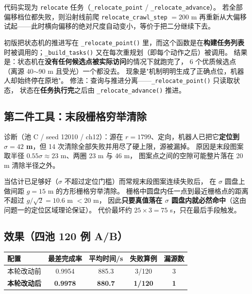 代码实现为 \texttt{relocate} 任务（\texttt{\_relocate\_point} / \texttt{\_relocate\_advance}）。
若全部偏移档位都失败，则沿射线前爬 \texttt{relocate\_crawl\_step} $=200$ m
再重新从大偏移试起——此时横向偏移的绝对尺度自动变小，等价于把二分继续下去。

\begin{warnbox}[title=实现中的一个真实 bug（值得记录）]
初版把状态机的推进写在 \texttt{\_relocate\_point()} 里，而这个函数是在\textbf{构建任务列表}
时被调用的；\texttt{\_build\_tasks()} 又在每次重规划（即每个动作之后）被调用。
结果是：状态机在\textbf{没有任何候选点被实际访问}的情况下就跑完了，
6 个优质候选点（离源 40$\sim$90 m 且受光）一个都没去。
现象是"机制明明生成了正确点位，机器人却始终停在原地"。
修法：查询与推进分离——\texttt{\_relocate\_point()} 只读取状态，
状态在\textbf{任务执行完}之后由 \texttt{\_relocate\_advance()} 推进。
\end{warnbox}

\subsection{第二件工具：末段栅格穷举清除}

诊断（池 C / seed 12010 / ch12）：源在 $r=1799$、定向，机器人已把它\textbf{定位到
$\sigma=42$ m}，但 14 次清除全部失败并用尽了硬上限，源被漏掉。
原因是末段图案取半径 $0.55\sigma\approx 23$ m、两圈 23 m 与 46 m，
图案点之间的空隙可能整片落在 20 m 清除半径之外。

\begin{keybox}[title=有保证的兜底]
当估计已足够好（$\sigma$ 不超过定位门槛）而常规末段图案连续失败后，
在 $\sigma$ 圆盘上做间距 $g=15$ m 的方形栅格穷举清除。
栅格中圆盘内任一点到最近栅格点的距离不超过 $g/\sqrt2=10.6$ m $<20$ m，
因此\textbf{只要真值落在 $\sigma$ 圆盘内就必然命中}（这由问题一的定位区域理论保证）。
代价最坏约 $25\times3=75$ s，只在最后手段触发。
\end{keybox}

\subsection{效果（四池 120 例 A/B）}

\begin{center}
\begin{tabular}{lcccc}
\toprule
配置 & 最差完成率 & 平均时间/s & 失败算例 & 漏源数 \\ \midrule
本轮改动前 & 0.9954 & 885.3 & 3/120 & 3 \\
\textbf{本轮改动后} & \textbf{0.9978} & \textbf{880.7} & \textbf{1/120} & \textbf{1} \\
\bottomrule
\end{tabular}
\end{center}

